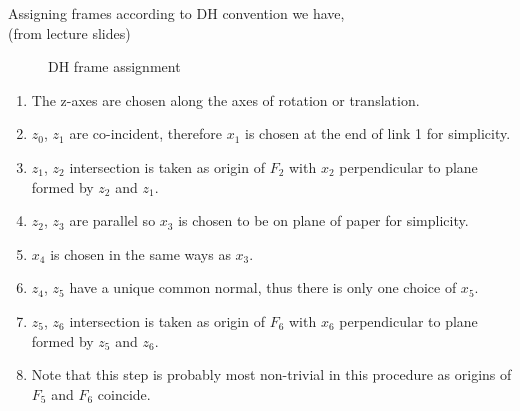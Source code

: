 \documentclass[12pt]{article}
\newcommand{\fromlectures}{{\\ \color{blue} \hspace*{\fill}(from lecture slides)} \\}
\begin{document}
Assigning frames according to DH convention we have,
\fromlectures
\begin{figure}[h]
  \centering
  \caption{DH frame assignment}
  \label{fig:q2.2}
\end{figure}
\begin{enumerate}[nolistsep]
  \item The z-axes are chosen along the axes of rotation or translation.
  \item $z_0$, $z_1$ are co-incident, therefore $x_1$ is chosen at the end of link 1 for simplicity.
  \item $z_1$, $z_2$ intersection is taken as origin of $F_2$ with $x_2$ perpendicular to plane formed by $z_2$ and $z_1$.
  \item $z_2$, $z_3$ are parallel so $x_3$ is chosen to be on plane of paper for simplicity.
  \item $x_4$ is chosen in the same ways as $x_3$.
  \item $z_4$, $z_5$ have a unique common normal, thus there is only one choice of $x_5$.
  \item $z_5$, $z_6$ intersection is taken as origin of $F_6$ with $x_6$ perpendicular to plane formed by $z_5$ and $z_6$.
  \item Note that this step is probably most non-trivial in this procedure as origins of $F_5$ and $F_6$ coincide.
\end{enumerate}
\end{document}
